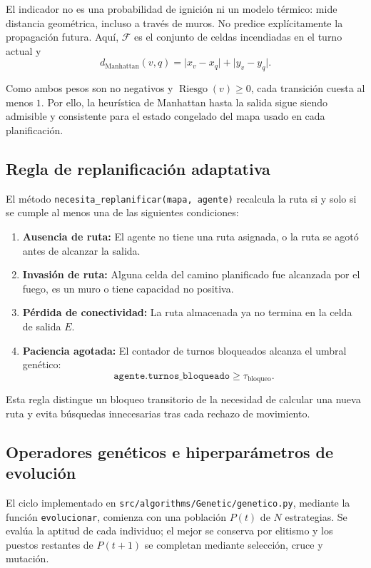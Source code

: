 \documentclass[11pt,letterpaper]{article}
\begin{document}
El indicador no es una probabilidad de ignición ni un modelo térmico: mide distancia geométrica, incluso a través de muros. No predice explícitamente la propagación futura. Aquí, $\mathcal{F}$ es el conjunto de celdas incendiadas en el turno actual y
\[
d_{\mathrm{Manhattan}}(v,q)
=
\lvert x_v-x_q\rvert+\lvert y_v-y_q\rvert.
\]

Como ambos pesos son no negativos y $\operatorname{Riesgo}(v)\geq 0$, cada transición cuesta al menos $1$. Por ello, la heurística de Manhattan hasta la salida sigue siendo admisible y consistente para el estado congelado del mapa usado en cada planificación.


\subsection{Regla de replanificación adaptativa}

El método \texttt{necesita\_replanificar(mapa, agente)} recalcula la ruta si y solo si se cumple al menos una de las siguientes condiciones:

\begin{enumerate}
    \item \textbf{Ausencia de ruta:} El agente no tiene una ruta asignada, o la ruta se agotó antes de alcanzar la salida.
    \item \textbf{Invasión de ruta:} Alguna celda del camino planificado fue alcanzada por el fuego, es un muro o tiene capacidad no positiva.
    \item \textbf{Pérdida de conectividad:} La ruta almacenada ya no termina en la celda de salida $E$.
    \item \textbf{Paciencia agotada:} El contador de turnos bloqueados alcanza el umbral genético:
    \[
        \texttt{agente.turnos\_bloqueado}
        \geq \tau_{\text{bloqueo}}.
    \]
\end{enumerate}

Esta regla distingue un bloqueo transitorio de la necesidad de calcular una nueva ruta y evita búsquedas innecesarias tras cada rechazo de movimiento.

\subsection{Operadores genéticos e hiperparámetros de evolución}

El ciclo implementado en \texttt{src/algorithms/Genetic/genetico.py}, mediante la función \texttt{evolucionar}, comienza con una población $P(t)$ de $N$ estrategias. Se evalúa la aptitud de cada individuo; el mejor se conserva por elitismo y los puestos restantes de $P(t+1)$ se completan mediante selección, cruce y mutación.
\end{document}
